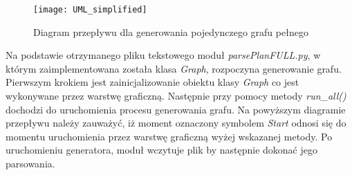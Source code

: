    \begin{figure}[H]
        \texttt{[image: UML\_simplified]}
        \centering
        \caption{Diagram przepływu dla generowania pojedynczego grafu pełnego}
    \end{figure}

    Na podstawie otrzymanego pliku tekstowego moduł \textit{parsePlanFULL.py}, w którym zaimplementowana została klasa \textit{Graph},
    rozpoczyna generowanie grafu. Pierwszym krokiem jest zainicjalizowanie obiektu klasy \textit{Graph} co jest wykonywane przez warstwę graficzną.
    Następnie przy pomocy metody \textit{run\_all()} dochodzi do uruchomienia procesu generowania grafu. Na powyższym diagramie przepływu należy 
    zauważyć, iż moment oznaczony symbolem \textit{Start} odnosi się do momentu uruchomienia przez warstwę graficzną wyżej wskazanej metody.
    Po uruchomieniu generatora, moduł wczytuje plik by następnie dokonać jego parsowania.

